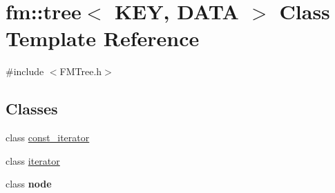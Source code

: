 \hypertarget{classfm_1_1tree}{
\section{fm::tree$<$ KEY, DATA $>$ Class Template Reference}
\label{classfm_1_1tree}
}


{\ttfamily \#include $<$FMTree.h$>$}

\subsection*{Classes}
\begin{DoxyCompactItemize}
\item 
class \hyperlink{classfm_1_1tree_1_1const__iterator}{const\_\-iterator}
\item 
class \hyperlink{classfm_1_1tree_1_1iterator}{iterator}
\item 
class {\bfseries node}
\end{DoxyCompactItemize}
